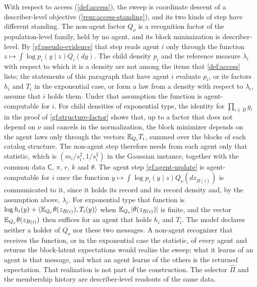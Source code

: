 With respect to access (\cref{def:access}), the sweep is coordinate descent
of a describer-level objective (\cref{rem:access-standing}), and its two
kinds of step have different standing. The non-agent factor $Q_\nu$ is a
recognition factor of the population-level family, held by no agent, and its
block minimization is describer-level. By \cref{gf:pseudo-evidence} that
step reads agent $i$ only through the function
$z\mapsto\int\log p_i(y\mid z)Q_i(dy)$. The child density $p_i$ and the
reference measure $\lambda_i$ with respect to which it is a density are not
among the items that \cref{def:access} lists; the statements of this
paragraph that have agent $i$ evaluate $p_i$, or its factors $h_i$ and $T_i$
in the exponential case, or form a law from a density with respect to
$\lambda_i$, assume that $i$ holds them. Under that assumption the function
is agent-computable for $i$. For child densities of exponential type,
the identity for $\prod_{i\in B}g_i$ in the proof of
\cref{gf:structure-factor} shows that, up to a factor that does not depend
on $\nu$ and cancels in the normalization, the block minimizer depends on
the agent laws only through the vectors $\mathbb E_{Q_i}T_i$, summed over the blocks
of each catalog structure. The non-agent step therefore needs from each
agent only that statistic, which is $(m_i/s_i^2,1/s_i^2)$ in the Gaussian
instance, together with the common data $\mathsf C$, $\pi$, $r$, $k$ and
$\theta$. The agent step \cref{gf:agent-update} is agent-computable for $i$
once the function $y\mapsto\int\log p_i(y\mid z)Q_\nu(dz_{B(i)})$ is
communicated to it, since it holds its record and its record density and,
by the assumption above, $\lambda_i$. For exponential type that function is
$\log h_i(y)+\langle\mathbb E_{Q_\nu}\theta(z_{B(i)}),T_i(y)\rangle$ when
$\mathbb E_{Q_\nu}|\theta(z_{B(i)})|$ is finite, and the vector
$\mathbb E_{Q_\nu}\theta(z_{B(i)})$ then suffices for an agent that holds $h_i$ and
$T_i$. The model declares neither a holder of $Q_\nu$ nor these two
messages. A non-agent recognizer that receives the function, or in the
exponential case the statistic, of every agent and returns the block-latent
expectations would realize the sweep; what it learns of an agent is that
message, and what an agent learns of the others is the returned expectation.
That realization is not part of the construction. The selector $\hat\Pi$
and the membership history are describer-level readouts of the same data.

